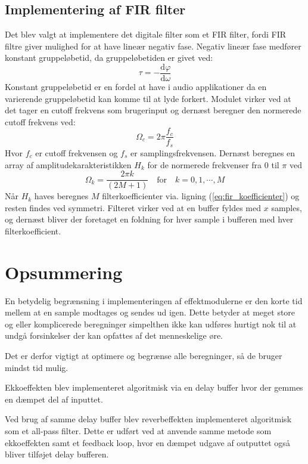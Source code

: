 \subsection{Implementering af FIR filter}
Det blev valgt at implementere det digitale filter som et FIR filter, fordi FIR filtre giver mulighed for at have lineær negativ fase.\newline
Negativ lineær fase medfører konstant gruppeløbetid, da gruppeløbetiden er givet ved\cite{wikiGroupdelay}:
\[
\tau = -\frac{\mathrm{d}\varphi}{\mathrm{d}\omega}
\]
Konstant gruppeløbetid er en fordel at have i audio applikationer da en varierende gruppeløbetid kan komme til at lyde forkert.\newline
Modulet virker ved at det tager en cutoff frekvens som brugerinput og dernæst beregner den normerede cutoff frekvens ved:
\[ \Omega_c = 2\pi\frac{f_c}{f_s} \]
Hvor $f_c$ er cutoff frekvensen og $f_s$ er samplingsfrekvensen.
Dernæst beregnes en array af amplitudekarakteristikken $H_k$ for de normerede frekvenser fra $0$ til $\pi$ ved 
\[ \Omega_k = \frac{2\pi k}{(2M + 1)} \quad \mathrm{for} \quad k = 0, 1, \cdots, M \]
Når $H_k$ haves beregnes $M$ filterkoefficienter via. ligning (\ref{eq:fir_koefficienter}) og resten findes ved symmetri.\newline
Filteret virker ved at en buffer fyldes med $x$ samples, og dernæst bliver der foretaget en foldning for hver sample i bufferen med hver filterkoefficient.

\section{Opsummering}
En betydelig begrænsning i implementeringen af effektmodulerne er den korte tid mellem at en sample modtages og sendes ud igen.
Dette betyder at meget store og eller komplicerede beregninger simpelthen ikke kan udføres hurtigt nok til at undgå forsinkelser der kan opfattes af det menneskelige øre.

Det er derfor vigtigt at optimere og begrænse alle beregninger, så de bruger mindst tid mulig. 

Ekkoeffekten blev implementeret algoritmisk via en delay buffer hvor der gemmes en dæmpet del af inputtet.

Ved brug af samme delay buffer blev reverbeffekten implementeret algoritmisk som et all-pass filter. Dette er udført ved at anvende samme metode som ekkoeffekten samt et feedback loop, hvor en dæmpet udgave af outputtet også bliver tilføjet delay bufferen.

